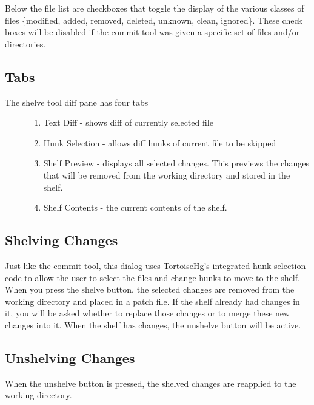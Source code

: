 \documentclass[letterpaper,10pt,english]{manual}
\begin{document}
Below the file list are checkboxes that toggle the display of the
various classes of files \{modified, added, removed, deleted, unknown,
clean, ignored\}.  These check boxes will be disabled if the commit tool
was given a specific set of files and/or directories.


\subsection{Tabs}
\begin{description}
\item[The shelve tool diff pane has four tabs]\begin{enumerate}
\item {} 
Text Diff - shows diff of currently selected file

\item {} 
Hunk Selection - allows diff hunks of current file to be skipped

\item {} 
Shelf Preview - displays all selected changes. This previews the
changes that will be removed from the working directory and
stored in the shelf.

\item {} 
Shelf Contents - the current contents of the shelf.

\end{enumerate}

\end{description}


\subsection{Shelving Changes}

Just like the commit tool, this dialog uses TortoiseHg's integrated hunk
selection code to allow the user to select the files and change hunks to
move to the shelf.  When you press the shelve button, the selected
changes are removed from the working directory and placed in a patch
file. If the shelf already had changes in it, you will be asked whether
to replace those changes or to merge these new changes into it.  When
the shelf has changes, the unshelve button will be active.


\subsection{Unshelving Changes}

When the unshelve button is pressed, the shelved changes are reapplied
to the working directory.
\end{document}
